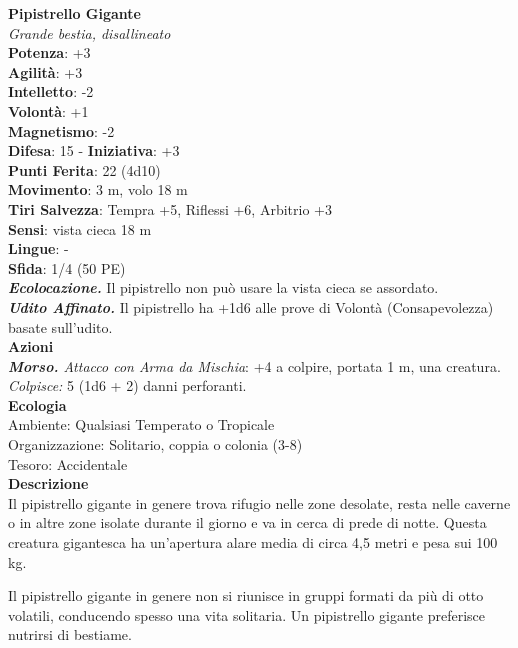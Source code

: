 \begin{multicols}{2}
\medskip\textbf{Pipistrello Gigante}\\
\emph{Grande bestia, disallineato}\\
\textbf{Potenza}: +3\\
\textbf{Agilità}: +3\\
\textbf{Intelletto}: -2\\
\textbf{Volontà}: +1\\
\textbf{Magnetismo}: -2\\
\textbf{Difesa}: 15 - \textbf{Iniziativa}: +3\\
\textbf{Punti Ferita}: 22 (4d10)\\
\textbf{Movimento}: 3 m, volo 18 m\\
\textbf{Tiri Salvezza}: Tempra +5, Riflessi +6, Arbitrio +3 \\
\textbf{Sensi}: vista cieca 18 m\\
\textbf{Lingue}: -\\
\textbf{Sfida}: 1/4 (50 PE)\smallskip\\
\emph{\textbf{Ecolocazione.}} Il pipistrello non può usare la vista cieca se assordato.\\
\emph{\textbf{Udito Affinato.}} Il pipistrello ha +1d6 alle prove di Volontà (Consapevolezza) basate sull'udito.\\
\smallskip\textbf{Azioni}\\
\emph{\textbf{Morso.} Attacco con Arma da Mischia}: +4 a colpire, portata 1 m, una creatura.\\
\emph{Colpisce:} 5 (1d6 + 2) danni perforanti.\\
\textbf{Ecologia}\\
Ambiente: Qualsiasi Temperato o Tropicale\\
Organizzazione: Solitario, coppia o colonia (3-8)\\
Tesoro: Accidentale \\
\textbf{Descrizione}\\

Il pipistrello gigante in genere trova rifugio nelle zone desolate, resta nelle caverne o in altre zone isolate durante il giorno e va in cerca di prede di notte. Questa creatura gigantesca ha un’apertura alare media di circa 4,5 metri e pesa sui 100 kg.

Il pipistrello gigante in genere non si riunisce in gruppi formati da più di otto volatili, conducendo spesso una vita solitaria. Un pipistrello gigante preferisce nutrirsi di bestiame. 


\end{multicols}
